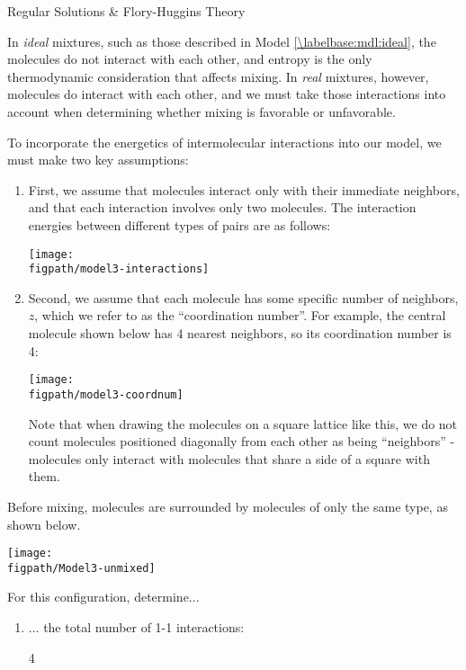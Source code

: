 \begin{activity}{Regular Solutions \& Flory-Huggins Theory}
\begin{ctqs}
\end{ctqs}
	
\clearpage
\begin{model}
\label{\labelbase:mdl:regular}

In \emph{ideal} mixtures, such as those described in Model \ref{\labelbase:mdl:ideal}, the molecules do not interact with each other, and entropy is the only thermodynamic consideration that affects mixing.
In \emph{real} mixtures, however, molecules do interact with each other, and we must take those interactions into account when determining whether mixing is favorable or unfavorable.

To incorporate the energetics of intermolecular interactions into our model, we must make two key assumptions:
\begin{enumerate}
	\item First, we assume that molecules interact only with their immediate neighbors, and that each interaction involves only two molecules.  The interaction energies between different types of pairs are as follows:

\centerline{\texttt{[image: \\figpath/model3-interactions]}}
	
	\item Second, we assume that each molecule has some specific number of neighbors, $z$, which we refer to as the ``coordination number''.  For example, the central molecule shown below has 4 nearest neighbors, so its coordination number is 4:

\centerline{\texttt{[image: \\figpath/model3-coordnum]}}

		Note that when drawing the molecules on a square lattice like this, we do not count molecules positioned diagonally from each other as being ``neighbors'' - molecules only interact with molecules that share a side of a square with them.

\end{enumerate}

\end{model}

\begin{ctqs}

	\question Before mixing, molecules are surrounded by molecules of only the same type, as shown below. \label{\labelbase:ctq:unmixedenthalpy}
	
		\centerline{\texttt{[image: \\figpath/Model3-unmixed]}}	
	
		For this configuration, determine...
		\begin{enumerate}	
			\item ... the total number of 1-1 interactions:
				\begin{solution}[0.25in]{}
					4
				\end{solution}
			

\end{enumerate}
\end{ctqs}
\end{activity}
